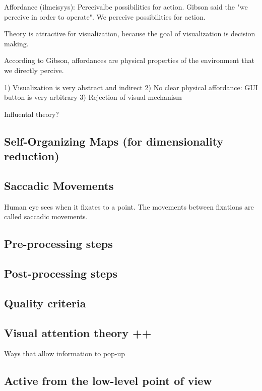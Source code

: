 \documentclass[a4paper]{article}
\begin{document}
Affordance (ilmeisyys): Perceivalbe possibilities for action. Gibson said the "we perceive in order to operate". We perceive possibilities for action. 

Theory is attractive for visualization, because the goal of visualization is decision making. 

According to Gibson, affordances are physical properties of the environment that we directly percive.

1) Visualization is very abstract and indirect
2) No clear physical affordance: GUI button is very arbitrary
3) Rejection of visual mechanism

Influental theory?

\subsection{Self-Organizing Maps (for dimensionality reduction)}

\subsection{Saccadic Movements}

Human eye sees when it fixates to a point. The movements between fixations are called saccadic movements.

\subsection{Pre-processing steps}

\subsection{Post-processing steps}

\subsection{Quality criteria}

\subsection{Visual attention theory ++}

Ways that allow information to pop-up



\subsection{Active from the low-level point of view}
\end{document}

